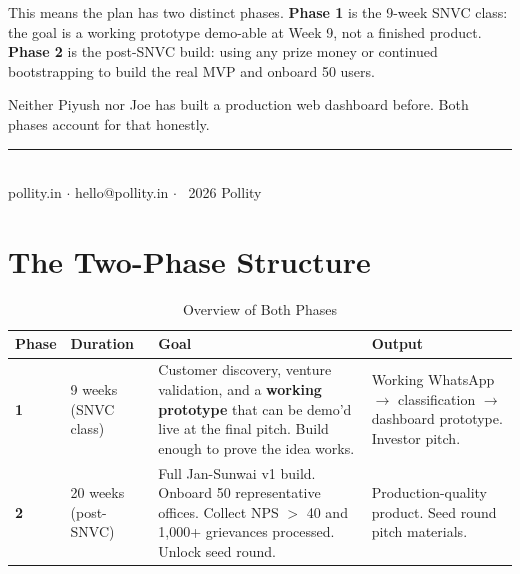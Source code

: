 \documentclass[12pt, a4paper]{article}
\begin{document}
\begin{titlepage}
\begin{tcolorbox}
    This means the plan has two distinct phases.
    \textbf{Phase 1} is the 9-week SNVC class: the goal is a working prototype
    demo-able at Week 9, not a finished product.
    \textbf{Phase 2} is the post-SNVC build: using any prize money or continued
    bootstrapping to build the real MVP and onboard 50 users.

    Neither Piyush nor Joe has built a production web dashboard before.
    Both phases account for that honestly.
    \end{tcolorbox}

    \vfill
    {\color{midgray}\rule{0.5\linewidth}{0.5pt}}\\[0.3cm]
    {\small pollity.in \quad $\cdot$ \quad hello@pollity.in \quad $\cdot$ \quad \textcopyright\ 2026 Pollity}
\end{titlepage}

\tableofcontents
\newpage

\section{The Two-Phase Structure}

\begin{table}[ht]
\centering
\caption{Overview of Both Phases}
\renewcommand{\arraystretch}{1.6}
\begin{tabularx}{\textwidth}{p{1.5cm} p{3cm} X p{2.5cm}}
\toprule
\rowcolor{pollitylightblue}
\textbf{Phase} & \textbf{Duration} & \textbf{Goal} & \textbf{Output} \\
\midrule
\rowcolor{lightpurple}
\textbf{1} & 9 weeks (SNVC class) & Customer discovery, venture validation, and a \textbf{working prototype} that can be demo'd live at the final pitch. Build enough to prove the idea works. & Working WhatsApp $\to$ classification $\to$ dashboard prototype. Investor pitch. \\
\midrule
\textbf{2} & 20 weeks (post-SNVC) & Full Jan-Sunwai v1 build. Onboard 50 representative offices. Collect NPS $>$ 40 and 1,000+ grievances processed. Unlock seed round. & Production-quality product. Seed round pitch materials. \\
\bottomrule
\end{tabularx}
\end{table}
\end{document}
